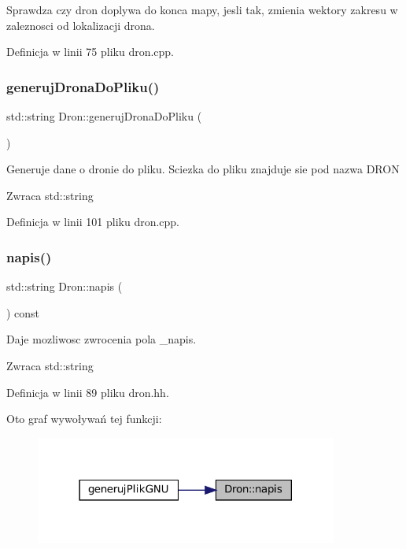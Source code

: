 Sprawdza czy dron doplywa do konca mapy, jesli tak, zmienia wektory zakresu w zaleznosci od lokalizacji drona. 

Definicja w linii 75 pliku dron.\+cpp.

\mbox{\label{class_dron_a9f0e086f054e87d53aff19dc29dca65a}} 
\subsubsection{\texorpdfstring{generujDronaDoPliku()}{generujDronaDoPliku()}}
{\footnotesize\ttfamily std\+::string Dron\+::generuj\+Drona\+Do\+Pliku (\begin{DoxyParamCaption}{ }\end{DoxyParamCaption})}

Generuje dane o dronie do pliku. Sciezka do pliku znajduje sie pod nazwa D\+R\+ON

\begin{DoxyReturn}{Zwraca}
std\+::string 
\end{DoxyReturn}


Definicja w linii 101 pliku dron.\+cpp.

\mbox{\label{class_dron_a4d0c2f94599951728a48f848942ed41a}} 
\subsubsection{\texorpdfstring{napis()}{napis()}}
{\footnotesize\ttfamily std\+::string Dron\+::napis (\begin{DoxyParamCaption}{ }\end{DoxyParamCaption}) const\hspace{0.3cm}{\ttfamily [inline]}}

Daje mozliwosc zwrocenia pola \+\_\+napis.

\begin{DoxyReturn}{Zwraca}
std\+::string 
\end{DoxyReturn}


Definicja w linii 89 pliku dron.\+hh.

Oto graf wywoływań tej funkcji\+:\nopagebreak
\begin{figure}[H]
\begin{center}
\leavevmode
\includegraphics[width=282pt]{class_dron_a4d0c2f94599951728a48f848942ed41a_icgraph}
\end{center}
\end{figure}
\mbox{\label{class_dron_adae3a230e5bad718740d216e14d6444f}} 
